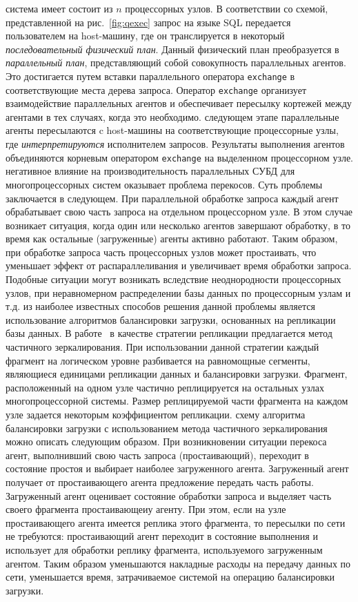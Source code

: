 \documentclass[11pt,oneside]{article}
\begin{document}
	 система имеет состоит из $n$ процессорных узлов. В соответствии со схемой, представленной на рис.~\ref{fig:qexec} запрос на языке SQL передается пользователем на host-машину, где он транслируется в некоторый \textit{последовательный физический план}. Данный физический план преобразуется в \textit{параллельный план}, представляющий собой совокупность параллельных агентов. Это достигается путем вставки параллельного оператора \texttt{exchange} в соответствующие места дерева запроса. Оператор \texttt{exchange} организует взаимодействие параллельных агентов и обеспечивает пересылку кортежей между агентами в тех случаях, когда это необходимо.
	 следующем этапе параллельные агенты пересылаются c host-машины на соответствующие процессорные узлы, где \textit{интерпретируются} исполнителем запросов. Результаты выполнения агентов объединяются корневым оператором \texttt{exchange} на выделенном процессорном узле.
	 негативное влияние на производительность параллельных СУБД для многопроцессорных систем оказывает проблема перекосов. Суть проблемы заключается в следующем. При параллельной обработке запроса каждый агент обрабатывает свою часть запроса на отдельном процессорном узле. В этом случае возникает ситуация, когда один или несколько агентов завершают обработку, в то время как остальные (загруженные) агенты активно работают. Таким образом, при обработке запроса часть процессорных узлов может простаивать, что уменьшает эффект от распараллеливания и увеличивает время обработки запроса. Подобные ситуации могут возникать вследствие неоднородности процессорных узлов, при неравномерном распределении базы данных по процессорным узлам и т.д.
	 из наиболее известных способов решения данной проблемы является использование алгоритмов балансировки загрузки, основанных на репликации базы данных. В работе~\cite{B_Lepikhov2006} в качестве стратегии репликации предлагается метод частичного зеркалирования. При использовании данной стратегии каждый фрагмент на логическом уровне разбивается на равномощные сегменты, являющиеся единицами репликации данных и балансировки загрузки. Фрагмент, расположенный на одном узле частично реплицируется на остальных узлах многопроцессорной системы. Размер реплицируемой части фрагмента на каждом узле задается некоторым коэффициентом репликации. 
	 схему алгоритма балансировки загрузки с использованием метода частичного зеркалирования можно описать следующим образом. При возникновении ситуации перекоса агент, выполнивший свою часть запроса (простаивающий), переходит в состояние простоя и выбирает наиболее загруженного агента. Загруженный агент получает от простаивающего агента предложение передать часть работы. Загруженный агент оценивает состояние обработки запроса и выделяет часть своего фрагмента  простаивающеиу агенту. При этом, если на узле простаивающего агента имеется реплика этого фрагмента, то пересылки по сети не требуются: простаивающий агент переходит в состояние выполнения и использует для обработки реплику фрагмента, используемого загруженным агентом. Таким образом уменьшаются накладные расходы на передачу данных по сети, уменьшается время, затрачиваемое системой на операцию балансировки загрузки.
\end{document}
